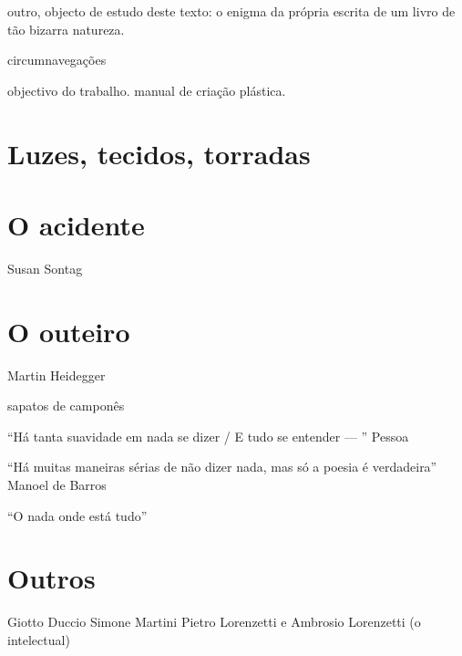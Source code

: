 \documentclass[12pt,a4paper]{article}
\begin{document}
outro, objecto de estudo deste texto: o enigma da própria escrita de um livro de tão bizarra natureza. 



circumnavegações

objectivo do trabalho. manual de criação plástica.

\section{Luzes, tecidos, torradas}

\section{O acidente}

Susan Sontag

\section{O outeiro}

Martin Heidegger

sapatos de camponês

``Há tanta suavidade em nada se dizer / E tudo se entender — '' Pessoa

``Há muitas maneiras sérias de não dizer nada, mas só a poesia é verdadeira'' Manoel de Barros

``O nada onde está tudo''

\section{Outros}

Giotto
Duccio
Simone Martini
Pietro Lorenzetti e Ambrosio Lorenzetti (o intelectual)

\printbibliography[heading=bibliography,title={Bibliografia}]
\end{document}
